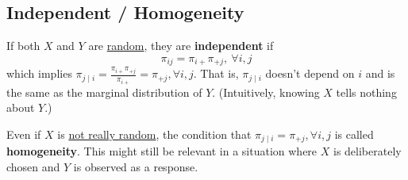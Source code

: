 \documentclass[11pt]{elegantbook}
\begin{document}
\subsection{Independent / Homogeneity}
\begin{definition}[independent]
    If both $X$ and $Y$ are \underline{random}, they are \textbf{independent} if $$\pi_{ij}=\pi_{i+}\pi_{+j},\ \forall i,j$$
    which implies $\pi_{j\mid i}=\frac{\pi_{i+}\pi_{+j}}{\pi_{i+}}=\pi_{+j},\forall i,j$. That is, $\pi_{j\mid i}$ doesn't depend on $i$ and is the same as the marginal distribution of $Y$. (Intuitively, knowing $X$ tells nothing about $Y$.)
\end{definition}
\begin{definition}[homogeneity]
    Even if $X$ is \underline{not really random}, the condition that $\pi_{j\mid i}=\pi_{+j},\forall i,j$ is called \textbf{homogeneity}. This might still be relevant in a situation where $X$ is deliberately chosen and $Y$ is observed as a response.
\end{definition}
\end{document}
